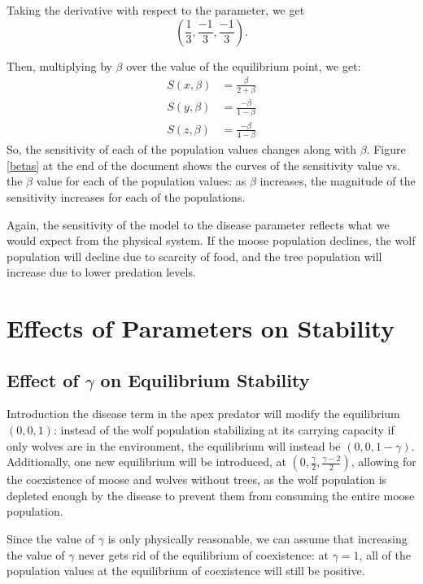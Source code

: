 \documentclass[10pt]{article}
\begin{document}
Taking the derivative with respect to the parameter, we get
\[\left(  \frac{1}{3},\frac{-1}{3},\frac{-1}{3} \right).\]

Then, multiplying by \(\beta\) over the value of the equilibrium point, we get:
\begin{align*}
S(x,\beta) &= \frac{\beta}{2+\beta} \\
S(y,\beta) &= \frac{-\beta}{1-\beta} \\
S(z,\beta) &= \frac{-\beta}{4-\beta}
\end{align*}
So, the sensitivity of each of the population values changes along with \(\beta\). Figure \ref{betas} at the end of the document shows the curves of the sensitivity value vs. the \(\beta\) value for each of the population values: as \(\beta\) increases, the magnitude of the sensitivity increases for each of the populations.

Again, the sensitivity of the model to the disease parameter reflects what we would expect from the physical system. If the moose population declines, the wolf population will decline due to scarcity of food, and the tree population will increase due to lower predation levels.

\section{Effects of Parameters on Stability}

\subsection{Effect of \(\gamma\) on Equilibrium Stability}
Introduction the disease term in the apex predator will modify the equilibrium \((0,0,1)\): instead of the wolf population stabilizing at its carrying capacity if only wolves are in the environment, the equilibrium will instead be \((0,0,1-\gamma)\). Additionally, one new equilibrium will be introduced, at \((0,\frac{\gamma}{2},\frac{\gamma-2}{2})\), allowing for the coexistence of moose and wolves without trees, as the wolf population is depleted enough by the disease to prevent them from consuming the entire moose population.

Since the value of \(\gamma\) is only physically reasonable, we can assume that increasing the value of \(\gamma\) never gets rid of the equilibrium of coexistence: at \(\gamma=1\), all of the population values at the equilibrium of coexistence will still be positive.
\end{document}
